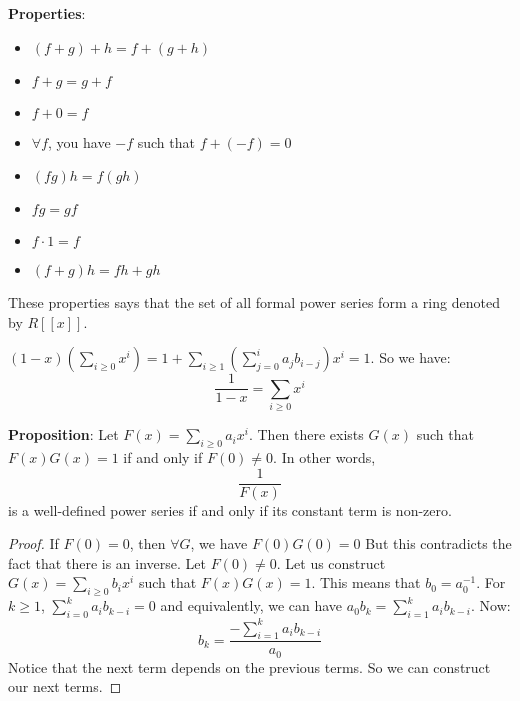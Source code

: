 \documentclass{report}
\begin{document}
\textbf{Properties}: 
    \begin{itemize}
        \item  $(f + g) + h = f + (g + h)$

        \item  $f + g = g + f$

        \item  $f + 0 = f$

        \item  $\forall f$, you have $-f$ such that $f + (-f) = 0$

        \item  $(fg)h = f(gh)$ 

        \item  $fg = gf$

        \item  $f \cdot 1 = f$

        \item  $(f + g)h = fh + gh$ 
    \end{itemize}
These properties says that the set of all formal power series form a ring denoted by $R[[x]]$.

\begin{examples}
    \begin{example}
        $(1 - x)(\sum_{i \geq 0}^{} x^{i}) = 1 + \sum_{i \geq 1}^{} (\sum_{j = 0}^{i} a_{j}b_{i - j})x^{i} = 1$. So we have:
            \begin{equation*}
                \dfrac{1}{1 - x} = \sum_{i \geq 0}^{} x^{i}
            \end{equation*}
    \end{example}
\end{examples}

\textbf{Proposition}: Let $F(x) = \sum_{i \geq 0}^{} a_{i}x^{i}$. Then there exists $G(x)$ such that $F(x)G(x) = 1$ if and only if $F(0) \neq 0$. In other words, 
    \begin{equation*}
        \dfrac{1}{F(x)}
    \end{equation*}
is a well-defined power series if and only if its constant term is non-zero.
    \begin{proof}
        If $F(0) = 0$, then $\forall G$, we have $F(0)G(0) = 0$ But this contradicts the fact that there is an inverse. Let $F(0) \neq 0$. Let us construct $G(x) = \sum_{i \geq 0}^{} b_{i}x^{i}$ such that $F(x)G(x) = 1$. This means that $b_{0} = a_{0}^{-1}$. For $k \geq 1$, $\sum_{i = 0}^{k} a_{i}b_{k - i} = 0$ and equivalently, we can have $a_{0}b_{k} = \sum_{i = 1}^{k} a_{i}b_{k - i}$. Now:
            \begin{equation*}
                b_{k} = \dfrac{-\sum_{i = 1}^{k} a_{i}b_{k - i}}{a_{0}}
            \end{equation*}
        Notice that the next term depends on the previous terms. So we can construct our next terms.
    \end{proof}
\end{document}
